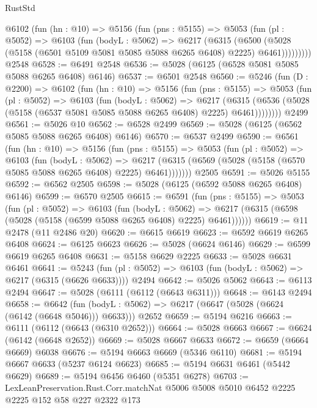 \begin{lexlean}{RustStd}
\begin{coremodule}
{\begin{coremodule}
{{{{{{{{{{{{      @6102
        (fun (hn : @10) =>
        @5156
          (fun (pns : @5155) =>
          @5053
            (fun (pl : @5052) =>
            @6103
              (fun (bodyL : @5062) =>
              @6217
                (@6315
                  (@6500
                    (@5028 (@5158 (@6501 @5109 @5081 @5085 @5088 @6265 @6408) @2225) @6461)))))))))
    @2548
@6528 := @6491 @2548
@6536 := @5028 (@6125 (@6528 @5081 @5085 @5088 @6265 @6408) @6146)
@6537 := @6501 @2548
@6560 := @5246
    (fun (D : @2200) =>
    @6102
      (fun (hn : @10) =>
      @5156
        (fun (pns : @5155) =>
        @5053
          (fun (pl : @5052) =>
          @6103
            (fun (bodyL : @5062) =>
            @6217
              (@6315 (@6536 (@5028 (@5158 (@6537 @5081 @5085 @5088 @6265 @6408) @2225) @6461))))))))
    @2499
@6561 := @5026 @10
@6562 := @6528 @2499
@6569 := @5028 (@6125 (@6562 @5085 @5088 @6265 @6408) @6146)
@6570 := @6537 @2499
@6590 := @6561
    (fun (hn : @10) =>
    @5156
      (fun (pns : @5155) =>
      @5053
        (fun (pl : @5052) =>
        @6103
          (fun (bodyL : @5062) =>
          @6217 (@6315 (@6569 (@5028 (@5158 (@6570 @5085 @5088 @6265 @6408) @2225) @6461)))))))
    @2505
@6591 := @5026 @5155
@6592 := @6562 @2505
@6598 := @5028 (@6125 (@6592 @5088 @6265 @6408) @6146)
@6599 := @6570 @2505
@6615 := @6591
    (fun (pns : @5155) =>
    @5053
      (fun (pl : @5052) =>
      @6103
        (fun (bodyL : @5062) =>
        @6217 (@6315 (@6598 (@5028 (@5158 (@6599 @5088 @6265 @6408) @2225) @6461))))))
@6619 := @11 @2478 (@11 @2486 @20)
@6620 := @6615 @6619
@6623 := @6592 @6619 @6265 @6408
@6624 := @6125 @6623
@6626 := @5028 (@6624 @6146)
@6629 := @6599 @6619 @6265 @6408
@6631 := @5158 @6629 @2225
@6633 := @5028 @6631 @6461
@6641 := @5243
    (fun (pl : @5052) => @6103 (fun (bodyL : @5062) => @6217 (@6315 (@6626 @6633))))
    @2494
@6642 := @5026 @5062
@6643 := @6113 @2494
@6647 := @5028 (@6111 (@6112 (@6643 @6311)))
@6648 := @6143 @2494
@6658 := @6642
    (fun (bodyL : @5062) => @6217 (@6647 (@5028 (@6624 (@6142 (@6648 @5046))) @6633)))
    @2652
@6659 := @5194 @6216
@6663 := @6111 (@6112 (@6643 (@6310 @2652)))
@6664 := @5028 @6663
@6667 := @6624 (@6142 (@6648 @2652))
@6669 := @5028 @6667 @6633
@6672 := @6659 (@6664 @6669) @6038
@6676 := @5194 @6663 @6669 (@5346 @6110)
@6681 := @5194 @6667 @6633 (@5237 @6124 @6623)
@6685 := @5194 @6631 @6461 (@5442 @6629)
@6689 := @5194 @6456 @6460 (@5351 @6278)
@6703 := LexLeanPreservation.Rust.Corr.matchNat
    @5006
    @5008
    @5010
    @6452
    @2225
    @2225
    @152
    @58
    @227
    @2322
    @173
}}}}}}}}}}}}
\end{coremodule}}
\end{coremodule}
\end{lexlean}
